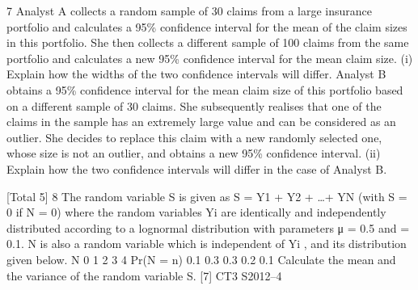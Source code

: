 \documentclass[a4paper,12pt]{article}
\begin{document}
\begin{enumerate}
[Total 7]
7 Analyst A collects a random sample of 30 claims from a large insurance portfolio and
calculates a 95\%  confidence interval for the mean of the claim sizes in this portfolio.
She then collects a different sample of 100 claims from the same portfolio and
calculates a new 95\%  confidence interval for the mean claim size.
(i) Explain how the widths of the two confidence intervals will differ. 
Analyst B obtains a 95\%  confidence interval for the mean claim size of this portfolio
based on a different sample of 30 claims. She subsequently realises that one of the
claims in the sample has an extremely large value and can be considered as an outlier.
She decides to replace this claim with a new randomly selected one, whose size is not
an outlier, and obtains a new 95\%  confidence interval.
(ii) Explain how the two confidence intervals will differ in the case of Analyst B.

[Total 5]
8 The random variable S is given as S = Y1 + Y2 + …+ YN (with S = 0 if N = 0) where
the random variables Yi are identically and independently distributed according to a
lognormal distribution with parameters μ = 0.5 and  = 0.1. N is also a random
variable which is independent of Yi , and its distribution given below.
N 0 1 2 3 4
Pr(N = n) 0.1 0.3 0.3 0.2 0.1
Calculate the mean and the variance of the random variable S. [7]
CT3 S2012–4


\end{enumerate}
\end{document}
